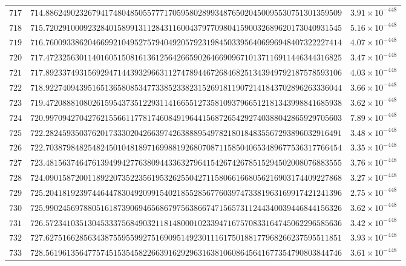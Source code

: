 \documentclass[12pt,reqno]{amsart}
\theoremstyle{remark}
\begin{document}
\begin{longtable}{clc}
$717$ & $714.8862490232679417480485055777170595802899348765020450095530751301359509$ & $3.91\times 10^{-448}$ \\
$718$ & $715.7202910009232840158991311284311600437977098041590032689620173040931545$ & $5.16\times 10^{-448}$ \\
$719$ & $716.7600933862046699210495275794049205792319845033956406996948407322227414$ & $4.07\times 10^{-448}$ \\
$720$ & $717.4723256301140160515081613612564266590264669096710137116911446344316825$ & $3.47\times 10^{-448}$ \\
$721$ & $717.8923374931569294714439329663112747894467268468251343949792187578593106$ & $4.03\times 10^{-448}$ \\
$722$ & $718.9227409439516513658085347733852338231526918119072141843702896263336044$ & $3.66\times 10^{-448}$ \\
$723$ & $719.4720888108026159543735122931141665512735810937966512181343998841685938$ & $3.62\times 10^{-448}$ \\
$724$ & $720.9970942704276215566117781746084919644156872654292740388042865929705603$ & $7.89\times 10^{-448}$ \\
$725$ & $722.2824593503762017333020426639742638889549782180184835567293896032916491$ & $3.48\times 10^{-448}$ \\
$726$ & $722.7038798482548245010481897169988192680708711585040653489677536317766454$ & $3.35\times 10^{-448}$ \\
$727$ & $723.4815637464761394994277638094433632796415426742678515294502008076883555$ & $3.76\times 10^{-448}$ \\
$728$ & $724.0901587200118922073522356195326255042711580661668056216903174409227868$ & $3.27\times 10^{-448}$ \\
$729$ & $725.2041819239744644783049209915402185528567760397473381963169917421241396$ & $2.75\times 10^{-448}$ \\
$730$ & $725.9902456978805161873906946568679756386674715657311244340039446844156326$ & $3.62\times 10^{-448}$ \\
$731$ & $726.5723410351304533375684903211814800010233947167570833164745062296585636$ & $3.42\times 10^{-448}$ \\
$732$ & $727.6275166285634387559559927516909514923011161750188177968266237595511851$ & $3.93\times 10^{-448}$ \\
$733$ & $728.5619613564775745153545822663916292963163810608645641677354790803844746$ & $3.61\times 10^{-448}$ \\

\end{longtable}
\end{document}
